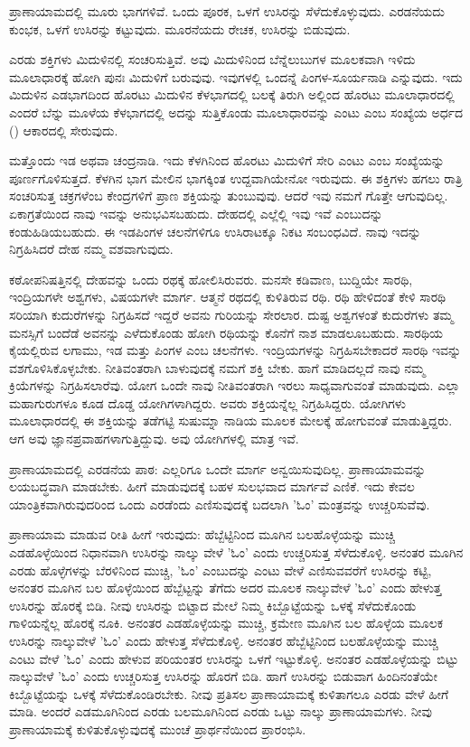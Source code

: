ಪ್ರಾಣಾಯಾಮದಲ್ಲಿ ಮೂರು ಭಾಗಗಳಿವೆ. ಒಂದು ಪೂರಕ, ಒಳಗೆ ಉಸಿರನ್ನು ಸೆಳೆದುಕೊಳ್ಳುವುದು. ಎರಡನೆಯದು ಕುಂಭಕ, ಒಳಗೆ ಉಸಿರನ್ನು ಕಟ್ಟುವುದು. ಮೂರನೆಯದು ರೇಚಕ, ಉಸಿರನ್ನು ಬಿಡುವುದು.

ಎರಡು ಶಕ್ತಿಗಳು ಮಿದುಳಿನಲ್ಲಿ ಸಂಚರಿಸುತ್ತಿವೆ. ಅವು ಮಿದುಳಿನಿಂದ ಬೆನ್ನೆಲುಬುಗಳ ಮೂಲಕವಾಗಿ ಇಳಿದು ಮೂಲಾಧಾರಕ್ಕೆ ಹೋಗಿ ಪುನಃ ಮಿದುಳಿಗೆ ಬರುವುವು. ಇವುಗಳಲ್ಲಿ ಒಂದನ್ನೆ ಪಿಂಗಳ-ಸೂರ್ಯನಾಡಿ ಎನ್ನುವುದು. ಇದು ಮಿದುಳಿನ ಎಡಭಾಗದಿಂದ ಹೊರಟು ಮಿದುಳಿನ ಕೆಳಭಾಗದಲ್ಲಿ ಬಲಕ್ಕೆ ತಿರುಗಿ ಅಲ್ಲಿಂದ ಹೊರಟು ಮೂಲಾಧಾರದಲ್ಲಿ ಎಂದರೆ ಬೆನ್ನು ಮೂಳೆಯ ಕೆಳಭಾಗದಲ್ಲಿ ಅದನ್ನು ಸುತ್ತಿಕೊಂಡು ಮೂಲಾಧಾರವನ್ನು ಎಂಟು ಎಂಬ ಸಂಖ್ಯೆಯ ಅರ್ಧದ () ಆಕಾರದಲ್ಲಿ ಸೇರುವುದು.

ಮತ್ತೊಂದು ಇಡ ಅಥವಾ ಚಂದ್ರನಾಡಿ. ಇದು ಕೆಳಗಿನಿಂದ ಹೊರಟು ಮಿದುಳಿಗೆ ಸೇರಿ ಎಂಟು ಎಂಬ ಸಂಖ್ಯೆಯನ್ನು ಪೂರ್ಣಗೊಳಿಸುತ್ತದೆ. ಕೆಳಗಿನ ಭಾಗ ಮೇಲಿನ ಭಾಗಕ್ಕಿಂತ ಉದ್ದವಾಗಿಯೇನೋ ಇರುವುದು. ಈ ಶಕ್ತಿಗಳು ಹಗಲು ರಾತ್ರಿ ಸಂಚರಿಸುತ್ತ ಚಕ್ರಗಳೆಂಬ ಕೇಂದ್ರಗಳಿಗೆ ಪ್ರಾಣ ಶಕ್ತಿಯನ್ನು ತುಂಬುವುವು. ಆದರೆ ಇವು ನಮಗೆ ಗೊತ್ತೇ ಆಗುವುದಿಲ್ಲ. ಏಕಾಗ್ರತೆಯಿಂದ ನಾವು ಇವನ್ನು ಅನುಭವಿಸಬಹುದು. ದೇಹದಲ್ಲಿ ಎಲ್ಲೆಲ್ಲಿ ಇವು ಇವೆ ಎಂಬುದನ್ನು ಕಂಡುಹಿಡಿಯಬಹುದು. ಈ ಇಡಪಿಂಗಳ ಚಲನೆಗಳಿಗೂ ಉಸಿರಾಟಕ್ಕೂ ನಿಕಟ ಸಂಬಂಧವಿದೆ. ನಾವು ಇದನ್ನು ನಿಗ್ರಹಿಸಿದರೆ ದೇಹ ನಮ್ಮ ವಶವಾಗುವುದು.

ಕಠೋಪನಿಷತ್ತಿನಲ್ಲಿ ದೇಹವನ್ನು ಒಂದು ರಥಕ್ಕೆ ಹೋಲಿಸಿರುವರು. ಮನಸೇ ಕಡಿವಾಣ, ಬುದ್ದಿಯೇ ಸಾರಥಿ, ಇಂದ್ರಿಯಗಳೇ ಅಶ್ವಗಳು, ವಿಷಯಗಳೇ ಮಾರ್ಗ. ಆತ್ಮನೆ ರಥದಲ್ಲಿ ಕುಳಿತಿರುವ ರಥಿ. ರಥಿ ಹೇಳಿದಂತೆ ಕೇಳಿ ಸಾರಥಿ ಸರಿಯಾಗಿ ಕುದುರೆಗಳನ್ನು ನಿಗ್ರಹಿಸದೆ ಇದ್ದರೆ ಅವನು ಗುರಿಯನ್ನು ಸೇರಲಾರ. ದುಷ್ಟ ಅಶ್ವಗಳಂತೆ ಕುದುರೆಗಳು ತಮ್ಮ ಮನಸ್ಸಿಗೆ ಬಂದೆಡೆ ಅವನನ್ನು ಎಳೆದುಕೊಂಡು ಹೋಗಿ ರಥಿಯನ್ನು ಕೊನೆಗೆ ನಾಶ ಮಾಡಲೂಬಹುದು. ಸಾರಥಿಯ ಕೈಯಲ್ಲಿರುವ ಲಗಾಮು, ಇಡ ಮತ್ತು ಪಿಂಗಳ ಎಂಬ ಚಲನೆಗಳು. ಇಂದ್ರಿಯಗಳನ್ನು ನಿಗ್ರಹಿಸಬೇಕಾದರೆ ಸಾರಥಿ ಇವನ್ನು ವಶಗೊಳಿಸಿಕೊಳ್ಳಬೇಕು. ನೀತಿವಂತರಾಗಿ ಬಾಳುವುದಕ್ಕೆ ನಮಗೆ ಶಕ್ತಿ ಬೇಕು. ಹಾಗೆ ಮಾಡಿದಲ್ಲದೆ ನಾವು ನಮ್ಮ ಕ್ರಿಯೆಗಳನ್ನು ನಿಗ್ರಹಿಸಲಾರೆವು. ಯೋಗ ಒಂದೇ ನಾವು ನೀತಿವಂತರಾಗಿ ಇರಲು ಸಾಧ್ಯವಾಗುವಂತೆ ಮಾಡುವುದು. ಎಲ್ಲಾ ಮಹಾಗುರುಗಳೂ ಕೂಡ ದೊಡ್ಡ ಯೋಗಿಗಳಾಗಿದ್ದರು. ಅವರು ಶಕ್ತಿಯನ್ನೆಲ್ಲ ನಿಗ್ರಹಿಸಿದ್ದರು. ಯೋಗಿಗಳು ಮೂಲಾಧಾರದಲ್ಲಿ ಈ ಶಕ್ತಿಯನ್ನು ತಡೆಗಟ್ಟಿ ಸುಷುಮ್ನಾ ನಾಡಿಯ ಮೂಲಕ ಮೇಲಕ್ಕೆ ಹೋಗುವಂತೆ ಮಾಡುತ್ತಿದ್ದರು. ಆಗ ಅವು ಜ್ಞಾನಪ್ರವಾಹಗಳಾಗುತ್ತಿದ್ದುವು. ಅವು ಯೋಗಿಗಳಲ್ಲಿ ಮಾತ್ರ ಇವೆ.

ಪ್ರಾಣಾಯಾಮದಲ್ಲಿ ಎರಡನೆಯ ಪಾಠ: ಎಲ್ಲರಿಗೂ ಒಂದೇ ಮಾರ್ಗ ಅನ್ವಯಿಸುವುದಿಲ್ಲ. ಪ್ರಾಣಾಯಾಮವನ್ನು ಲಯಬದ್ಧವಾಗಿ ಮಾಡಬೇಕು. ಹೀಗೆ ಮಾಡುವುದಕ್ಕೆ ಬಹಳ ಸುಲಭವಾದ ಮಾರ್ಗವೆ ಎಣಿಕೆ. ಇದು ಕೇವಲ ಯಾಂತ್ರಿಕವಾಗಿರುವುದರಿಂದ ಒಂದು ಎರಡೆಂದು ಎಣಿಸುವುದಕ್ಕೆ ಬದಲಾಗಿ 'ಓಂ' ಮಂತ್ರವನ್ನು ಉಚ್ಚರಿಸುವೆವು.

ಪ್ರಾಣಾಯಾಮ ಮಾಡುವ ರೀತಿ ಹೀಗೆ ಇರುವುದು: ಹೆಬ್ಬೆಟ್ಟಿನಿಂದ ಮೂಗಿನ ಬಲಹೊಳ್ಳೆಯನ್ನು ಮುಚ್ಚಿ ಎಡಹೊಳ್ಳೆಯಿಂದ ನಿಧಾನವಾಗಿ ಉಸಿರನ್ನು ನಾಲ್ಕು ವೇಳೆ 'ಓಂ' ಎಂದು ಉಚ್ಚರಿಸುತ್ತ ಸೆಳೆದುಕೊಳ್ಳಿ. ಅನಂತರ ಮೂಗಿನ ಎರಡು ಹೊಳ್ಳೆಗಳನ್ನು ಬೆರಳಿನಿಂದ ಮುಚ್ಚಿ, 'ಓಂ' ಎಂಬುದನ್ನು ಎಂಟು ವೇಳೆ ಎಣಿಸುವವರೆಗೆ ಉಸಿರನ್ನು ಕಟ್ಟಿ, ಅನಂತರ ಮೂಗಿನ ಬಲ ಹೊಳ್ಳೆಯಿಂದ ಹೆಬ್ಬೆಟ್ಟನ್ನು ತೆಗೆದು ಅದರ ಮೂಲಕ ನಾಲ್ಕುವೇಳೆ 'ಓಂ' ಎಂದು ಹೇಳುತ್ತ ಉಸಿರನ್ನು ಹೊರಕ್ಕೆ ಬಿಡಿ. ನೀವು ಉಸಿರನ್ನು ಬಿಟ್ಟಾದ ಮೇಲೆ ನಿಮ್ಮ ಕಿಬ್ಬೊಟ್ಟೆಯನ್ನು ಒಳಕ್ಕೆ ಸೆಳೆದುಕೊಂಡು ಗಾಳಿಯನ್ನೆಲ್ಲ ಹೊರಕ್ಕೆ ನೂಕಿ. ಅನಂತರ ಎಡಹೊಳ್ಳೆಯನ್ನು ಮುಚ್ಚಿ, ಕ್ರಮೇಣ ಮೂಗಿನ ಬಲ ಹೊಳ್ಳೆಯ ಮೂಲಕ ಉಸಿರನ್ನು ನಾಲ್ಕುವೇಳೆ 'ಓಂ' ಎಂದು ಹೇಳುತ್ತ ಸೆಳೆದುಕೊಳ್ಳಿ. ಅನಂತರ ಹೆಬ್ಬೆಟ್ಟಿನಿಂದ ಬಲಹೊಳ್ಳೆಯನ್ನು ಮುಚ್ಚಿ ಎಂಟು ವೇಳೆ 'ಓಂ' ಎಂದು ಹೇಳುವ ಪರಿಯಂತರ ಉಸಿರನ್ನು ಒಳಗೆ ಇಟ್ಟುಕೊಳ್ಳಿ. ಅನಂತರ ಎಡಹೊಳ್ಳೆಯನ್ನು ಬಿಟ್ಟು ನಾಲ್ಕುವೇಳೆ 'ಓಂ' ಎಂದು ಉಚ್ಚರಿಸುತ್ತ ಉಸಿರನ್ನು ಹೊರಗೆ ಬಿಡಿ. ಹಾಗೆ ಉಸಿರನ್ನು ಬಿಡುವಾಗ ಹಿಂದಿನಂತೆಯೇ ಕಿಬ್ಬೊಟ್ಟೆಯನ್ನು ಒಳಕ್ಕೆ ಸೆಳೆದುಕೊಂಡಿರಬೇಕು. ನೀವು ಪ್ರತಿಸಲ ಪ್ರಾಣಾಯಾಮಕ್ಕೆ ಕುಳಿತಾಗಲೂ ಎರಡು ವೇಳೆ ಹೀಗೆ ಮಾಡಿ. ಅಂದರೆ ಎಡಮೂಗಿನಿಂದ ಎರಡು ಬಲಮೂಗಿನಿಂದ ಎರಡು ಒಟ್ಟು ನಾಲ್ಕು ಪ್ರಾಣಾಯಾಮಗಳು. ನೀವು ಪ್ರಾಣಾಯಾಮಕ್ಕೆ ಕುಳಿತುಕೊಳ್ಳುವುದಕ್ಕೆ ಮುಂಚೆ ಪ್ರಾರ್ಥನೆಯಿಂದ ಪ್ರಾರಂಭಿಸಿ.

